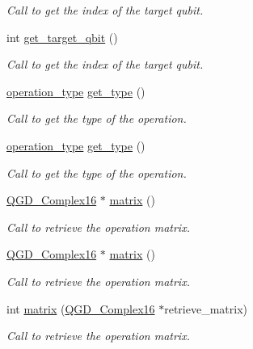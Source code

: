\begin{DoxyCompactItemize}
\begin{DoxyCompactList}\small\item\em Call to get the index of the target qubit. \end{DoxyCompactList}\item 
int \hyperlink{class_operation_a55eee2ad4b90be085b1ec2ce018502f8}{get\+\_\+target\+\_\+qbit} ()
\begin{DoxyCompactList}\small\item\em Call to get the index of the target qubit. \end{DoxyCompactList}\item 
\hyperlink{operations_2include_2_operation_8h_ad99e62941c8e4b13e5fc45ecaaf65eff}{operation\+\_\+type} \hyperlink{class_operation_acc601a7a00616fd6e2a61f61e084afac}{get\+\_\+type} ()
\begin{DoxyCompactList}\small\item\em Call to get the type of the operation. \end{DoxyCompactList}\item 
\hyperlink{operations_2include_2_operation_8h_ad99e62941c8e4b13e5fc45ecaaf65eff}{operation\+\_\+type} \hyperlink{class_operation_acc601a7a00616fd6e2a61f61e084afac}{get\+\_\+type} ()
\begin{DoxyCompactList}\small\item\em Call to get the type of the operation. \end{DoxyCompactList}\item 
\hyperlink{struct_q_g_d___complex16}{Q\+G\+D\+\_\+\+Complex16} $\ast$ \hyperlink{class_c_n_o_t_a50fefe3d884b9d5fcc20d6855e75e602}{matrix} ()
\begin{DoxyCompactList}\small\item\em Call to retrieve the operation matrix. \end{DoxyCompactList}\item 
\hyperlink{struct_q_g_d___complex16}{Q\+G\+D\+\_\+\+Complex16} $\ast$ \hyperlink{class_c_n_o_t_ae84e8aa35cc1354c896ce8c93918e7e4}{matrix} ()
\begin{DoxyCompactList}\small\item\em Call to retrieve the operation matrix. \end{DoxyCompactList}\item 
int \hyperlink{class_c_n_o_t_a8c9e4d814e5e883e0e10eb0a1e1dafe3}{matrix} (\hyperlink{struct_q_g_d___complex16}{Q\+G\+D\+\_\+\+Complex16} $\ast$retrieve\+\_\+matrix)
\begin{DoxyCompactList}\small\item\em Call to retrieve the operation matrix. \end{DoxyCompactList}\item 

\end{DoxyCompactItemize}
